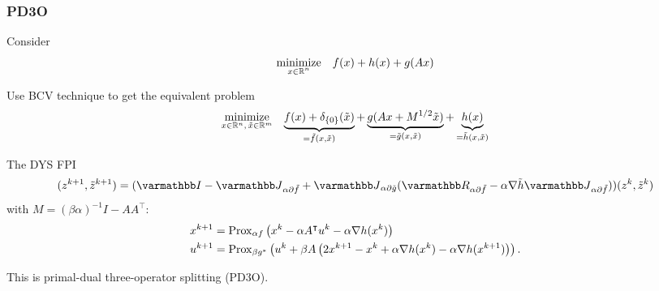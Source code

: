 \documentclass[10pt,mathserif]{beamer}
\begin{document}
\begin{frame}[plain]
\frametitle{PD3O}
Consider 
\[
\begin{array}{ll}
\underset{\substack{x\in \mathbb{R}^n}}{\mbox{minimize}}&f(x)+h(x)+g(Ax)
\end{array}
\]

\vspace{0.2in}

Use BCV technique to get the equivalent problem
\[
\begin{array}{ll}
\underset{x\in \mathbb{R}^n,\,\tilde{x}\in \mathbb{R}^m}{\mbox{minimize}}&
\underbrace{f(x)+
\delta_{\{0\}}(\tilde{x})}_{=\tilde{f}(x,\tilde{x})}
+\underbrace{g(Ax+M^{1/2}\tilde{x})}_{=\tilde{g}(x,\tilde{x})}
+\underbrace{h(x)}_{=\tilde{h}(x,\tilde{x})}
\end{array}
\]

The DYS FPI
\[
(z^{k+1},\tilde{z}^{k+1})=
(\opI-\opJ_{\alpha \partial \tilde{f}}+\opJ_{\alpha \partial \tilde{g}}(\opR_{\alpha \partial \tilde{f}}-\alpha \nabla\tilde{h}\opJ_{\alpha \partial \tilde{f}}))
(z^{k},\tilde{z}^{k})
\]
with $M=(\beta\alpha)^{-1}I-AA^\intercal$:
\begin{align*}
    x^{k+1}&=\mathrm{Prox}_{\alpha f}\left(x^{k}-\alpha A^\intercal u ^{k}-\alpha \nabla h(x^{k})\right)\\
     u^{k+1}&=\mathrm{Prox}_{\beta g^*}\left(
     u^k+\beta A\left(2x^{k+1}-x^{k} + \alpha \nabla h(x^{k}) - \alpha \nabla h(x^{k+1})\right)
    \right).
\end{align*}

This is primal-dual three-operator splitting (PD3O).
\end{frame} 
\end{document}
